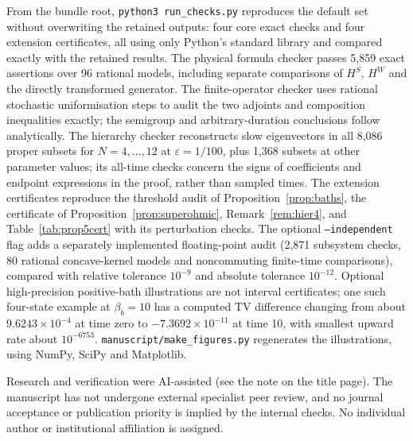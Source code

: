 \documentclass[11pt,a4paper]{article}
\theoremstyle{remark}\newtheorem{remark}[theorem]{Remark}
\begin{document}
From the bundle root, \texttt{python3 run\_checks.py} reproduces the default set without overwriting the retained outputs: four core exact checks and four extension certificates, all using only Python's standard library and compared exactly with the retained results. The physical formula checker passes 5,859 exact assertions over 96 rational models, including separate comparisons of $H^S$, $H^W$ and the directly transformed generator. The finite-operator checker uses rational stochastic uniformisation steps to audit the two adjoints and composition inequalities exactly; the semigroup and arbitrary-duration conclusions follow analytically. The hierarchy checker reconstructs slow eigenvectors in all 8,086 proper subsets for $N=4,\ldots,12$ at $\varepsilon=1/100$, plus 1,368 subsets at other parameter values; its all-time checks concern the signs of coefficients and endpoint expressions in the proof, rather than sampled times. The extension certificates reproduce the threshold audit of Proposition~\ref{prop:baths}, the certificate of Proposition~\ref{prop:superohmic}, Remark~\ref{rem:hier4}, and Table~\ref{tab:prop5cert} with its perturbation checks. The optional \texttt{--independent} flag adds a separately implemented floating-point audit (2,871 subsystem checks, 80 rational concave-kernel models and noncommuting finite-time comparisons), compared with relative tolerance $10^{-9}$ and absolute tolerance $10^{-12}$. Optional high-precision positive-bath illustrations are not interval certificates; one such four-state example at $\beta_b=10$ has a computed TV difference changing from about $9.6243\times10^{-4}$ at time zero to $-7.3692\times10^{-11}$ at time 10, with smallest upward rate about $10^{-6753}$. \texttt{manuscript/make\_figures.py} regenerates the illustrations, using NumPy, SciPy and Matplotlib.

Research and verification were AI-assisted (see the note on the title page). The manuscript has not undergone external specialist peer review, and no journal acceptance or publication priority is implied by the internal checks. No individual author or institutional affiliation is assigned.

\appendix
\end{document}
